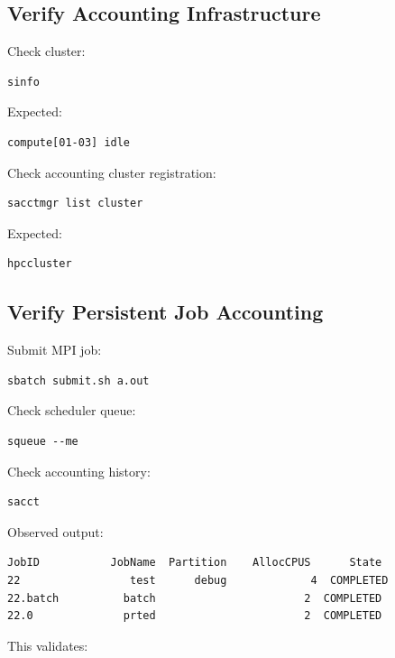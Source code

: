 \documentclass[11pt]{article}
\begin{document}
\subsection{Verify Accounting Infrastructure}
\label{sec:org836f678}

Check cluster:

\begin{verbatim}
sinfo
\end{verbatim}

Expected:

\begin{verbatim}
compute[01-03] idle
\end{verbatim}

Check accounting cluster registration:

\begin{verbatim}
sacctmgr list cluster
\end{verbatim}

Expected:

\begin{verbatim}
hpccluster
\end{verbatim}
\subsection{Verify Persistent Job Accounting}
\label{sec:orgb9e198c}

Submit MPI job:

\begin{verbatim}
sbatch submit.sh a.out
\end{verbatim}

Check scheduler queue:

\begin{verbatim}
squeue --me
\end{verbatim}

Check accounting history:

\begin{verbatim}
sacct
\end{verbatim}

Observed output:

\begin{verbatim}
JobID           JobName  Partition    AllocCPUS      State
22                 test      debug             4  COMPLETED
22.batch          batch                       2  COMPLETED
22.0              prted                       2  COMPLETED
\end{verbatim}

This validates:
\end{document}
